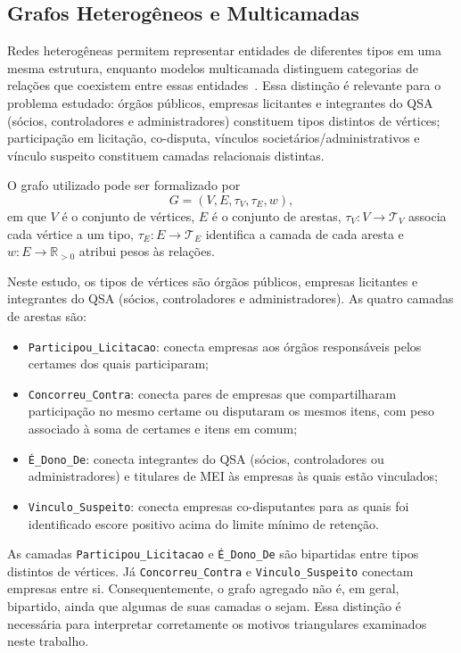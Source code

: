 \subsection{Grafos Heterogêneos e Multicamadas}

Redes heterogêneas permitem representar entidades de diferentes tipos em uma mesma estrutura, enquanto modelos multicamada distinguem categorias de relações que coexistem entre essas entidades~\cite{kivela2014multilayer,newman2018networks}. Essa distinção é relevante para o problema estudado: órgãos públicos, empresas licitantes e integrantes do QSA (sócios, controladores e administradores) constituem tipos distintos de vértices; participação em licitação, co-disputa, vínculos societários/administrativos e vínculo suspeito constituem camadas relacionais distintas.

O grafo utilizado pode ser formalizado por
\begin{equation}
  G=(V,E,\tau_V,\tau_E,w),
  \label{eq:grafo_multicamada}
\end{equation}
em que $V$ é o conjunto de vértices, $E$ é o conjunto de arestas, $\tau_V:V\rightarrow\mathcal{T}_V$ associa cada vértice a um tipo, $\tau_E:E\rightarrow\mathcal{T}_E$ identifica a camada de cada aresta e $w:E\rightarrow\mathbb{R}_{>0}$ atribui pesos às relações.

Neste estudo, os tipos de vértices são órgãos públicos, empresas licitantes e integrantes do QSA (sócios, controladores e administradores). As quatro camadas de arestas são:
\begin{itemize}
  \item \texttt{Participou\_Licitacao}: conecta empresas aos órgãos responsáveis pelos certames dos quais participaram;
  \item \texttt{Concorreu\_Contra}: conecta pares de empresas que compartilharam participação no mesmo certame ou disputaram os mesmos itens, com peso associado à soma de certames e itens em comum;
  \item \texttt{É\_Dono\_De}: conecta integrantes do QSA (sócios, controladores ou administradores) e titulares de MEI às empresas às quais estão vinculados;
  \item \texttt{Vinculo\_Suspeito}: conecta empresas co-disputantes para as quais foi identificado escore positivo acima do limite mínimo de retenção.
\end{itemize}

As camadas \texttt{Participou\_Licitacao} e \texttt{É\_Dono\_De} são bipartidas entre tipos distintos de vértices. Já \texttt{Concorreu\_Contra} e \texttt{Vinculo\_Suspeito} conectam empresas entre si. Consequentemente, o grafo agregado não é, em geral, bipartido, ainda que algumas de suas camadas o sejam. Essa distinção é necessária para interpretar corretamente os motivos triangulares examinados neste trabalho.

